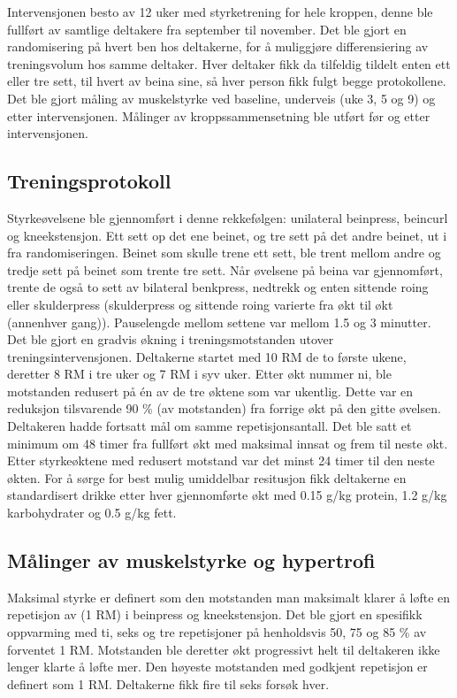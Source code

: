 \documentclass[
  letterpaper,
  DIV=11,
  numbers=noendperiod]{scrreprt}
\begin{document}
Intervensjonen besto av 12 uker med styrketrening for hele kroppen,
denne ble fullført av samtlige deltakere fra september til november. Det
ble gjort en randomisering på hvert ben hos deltakerne, for å muliggjøre
differensiering av treningsvolum hos samme deltaker. Hver deltaker fikk
da tilfeldig tildelt enten ett eller tre sett, til hvert av beina sine,
så hver person fikk fulgt begge protokollene. Det ble gjort måling av
muskelstyrke ved baseline, underveis (uke 3, 5 og 9) og etter
intervensjonen. Målinger av kroppssammensetning ble utført før og etter
intervensjonen.

\subsection{Treningsprotokoll}\label{treningsprotokoll}

Styrkeøvelsene ble gjennomført i denne rekkefølgen: unilateral
beinpress, beincurl og kneekstensjon. Ett sett op det ene beinet, og tre
sett på det andre beinet, ut i fra randomiseringen. Beinet som skulle
trene ett sett, ble trent mellom andre og tredje sett på beinet som
trente tre sett. Når øvelsene på beina var gjennomført, trente de også
to sett av bilateral benkpress, nedtrekk og enten sittende roing eller
skulderpress (skulderpress og sittende roing varierte fra økt til økt
(annenhver gang)). Pauselengde mellom settene var mellom 1.5 og 3
minutter. Det ble gjort en gradvis økning i treningsmotstanden utover
treningsintervensjonen. Deltakerne startet med 10 RM de to første ukene,
deretter 8 RM i tre uker og 7 RM i syv uker. Etter økt nummer ni, ble
motstanden redusert på én av de tre øktene som var ukentlig. Dette var
en reduksjon tilsvarende 90 \% (av motstanden) fra forrige økt på den
gitte øvelsen. Deltakeren hadde fortsatt mål om samme repetisjonsantall.
Det ble satt et minimum om 48 timer fra fullført økt med maksimal innsat
og frem til neste økt. Etter styrkeøktene med redusert motstand var det
minst 24 timer til den neste økten. For å sørge for best mulig
umiddelbar resitusjon fikk deltakerne en standardisert drikke etter hver
gjennomførte økt med 0.15 g/kg protein, 1.2 g/kg karbohydrater og 0.5
g/kg fett.

\subsection{Målinger av muskelstyrke og
hypertrofi}\label{muxe5linger-av-muskelstyrke-og-hypertrofi}

Maksimal styrke er definert som den motstanden man maksimalt klarer å
løfte en repetisjon av (1 RM) i beinpress og kneekstensjon. Det ble
gjort en spesifikk oppvarming med ti, seks og tre repetisjoner på
henholdsvis 50, 75 og 85 \% av forventet 1 RM. Motstanden ble deretter
økt progressivt helt til deltakeren ikke lenger klarte å løfte mer. Den
høyeste motstanden med godkjent repetisjon er definert som 1 RM.
Deltakerne fikk fire til seks forsøk hver.
\end{document}
